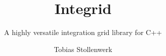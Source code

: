 \documentclass[a4paper]{scrreprt}
\begin{document}
\title{Integrid}
\subtitle{A highly versatile integration grid library for C++}
\author{Tobias Stollenwerk}
\maketitle

\tableofcontents














\printindex
\end{document}
